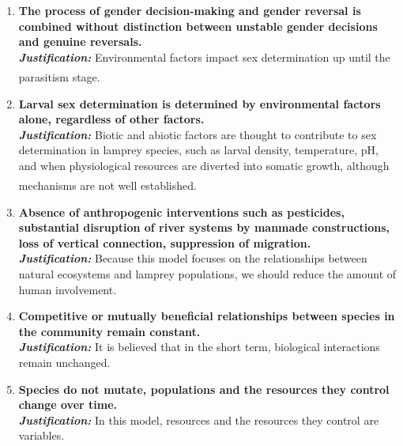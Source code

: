 \documentclass[12pt]{article}  %
\newcommand{\upcite}[1]{\textsuperscript{\textsuperscript{\cite{#1}}}}
\begin{document}
\begin{enumerate}
	\item \textbf{%
	The process of gender decision-making and gender reversal is combined without distinction between unstable gender decisions and genuine reversals.}\\
	\textbf{\textit{Justification: }}%
	Environmental factors impact sex determination up until the parasitism stage.\upcite{2}
	\item \textbf{%
	Larval sex determination is determined by environmental factors alone, regardless of other factors.}\\
	\textbf{\textit{Justification: }}
	Biotic and abiotic factors are thought to contribute to sex
	determination in lamprey species, such as larval
	density, temperature, pH, and when physiological
	resources are diverted into somatic growth, although mechanisms are not well established.\upcite{1}
	\item \textbf{%
	Absence of anthropogenic interventions such as pesticides, substantial disruption of river systems by manmade constructions, loss of vertical connection, suppression of migration.}\\
	\textbf{\textit{Justification: }} %
	Because this model focuses on the relationships between natural ecosystems and lamprey populations, we should reduce the amount of human involvement.
	\item \textbf{%
	Competitive or mutually beneficial relationships between species in the community remain constant.}\\
	\textbf{\textit{Justification: }}%
	It is believed that in the short term, biological interactions remain unchanged.
	\item \textbf{%
	Species do not mutate, populations and the resources they control change over time.}\\
	\textbf{\textit{Justification: }}%
	In this model, resources and the resources they control are variables.

\end{enumerate}
\end{document}
